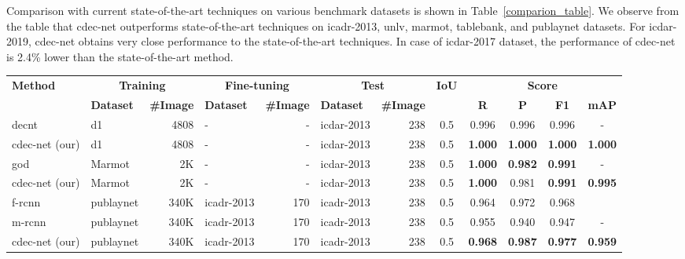 \documentclass[a4paper,conference]{IEEEtran}
\begin{document}
Comparison with current state-of-the-art techniques on various benchmark datasets is shown in Table~\ref{comparion_table}. We observe from the table that {\sc cd}e{\sc c-n}et outperforms state-of-the-art techniques on {\sc icadr-2013}, {\sc unlv}, {\sc m}armot, {\sc t}able{\sc b}ank, and {\sc p}ub{\sc l}ay{\sc n}et datasets. For {\sc icdar-2019}, {\sc cd}e{\sc c-n}et obtains very close performance to the state-of-the-art techniques. In case of {\sc icdar-2017} dataset, the performance of {\sc cd}e{\sc c-n}et is 2.4\% lower than the state-of-the-art method.

\begin{table*}
\addtolength{\tabcolsep}{-1.0pt}
\begin{center}
\begin{tabular}{|l| l | r|l |r|l|r| c| c c c c|} \hline
\textbf{Method} &\multicolumn{2}{|c|}{\textbf{Training}} &\multicolumn{2}{|c|}{\textbf{Fine-tuning}} &\multicolumn{2}{|c|}{\textbf{Test}} &\textbf{IoU} & \multicolumn{4}{|c|}{\textbf{Score}} \\ \cline{2-7} \cline{9-12}
  &\textbf{Dataset} &\textbf{\#Image} &\textbf{Dataset} &\textbf{\#Image} &\textbf{Dataset} &\textbf{\#Image} &  &\textbf{R} &\textbf{P} &\textbf{F1} &\textbf{mAP} \\ \hline
{\sc d}e{\sc cnt}~\cite{siddiqui2018decnt} &{\sc d}1 &4808 &- &- &{\sc icdar}-2013 &238 &0.5 &0.996 &0.996 &0.996 &- \\ 
{\sc cd}e{\sc c-n}et (our) &{\sc d}1 &4808 &- &- &{\sc icdar}-2013 &238 &0.5 &\textbf{1.000} &\textbf{1.000} &\textbf{1.000} &\textbf{1.000} \\ 
\hhline{|=|=|=|=|=|=|=|=|====|}
{\sc god}~\cite{saha2019graphical}   &Marmot &2K &- &- &{\sc icdar}-2013 &238 &0.5  &\textbf{1.000} &\textbf{0.982} &\textbf{0.991} &-  \\ 
{\sc cd}e{\sc c-n}et (our)         &Marmot &2K &-  &-  &{\sc icdar}-2013 &238 &0.5  &\textbf{1.000} &0.981 &\textbf{0.991} &\textbf{0.995}  \\ \hhline{|=|=|=|=|=|=|=|=|====|} 
{\sc f-rcnn}~\cite{zhong2019publaynet} &{\sc p}ub{\sc l}ay{\sc n}et &340K &{\sc icadr}-2013 &170 &{\sc icadr}-2013 &238 &0.5 &0.964 &0.972 &0.968 &  \\ 
{\sc m-rcnn}~\cite{zhong2019publaynet} &{\sc p}ub{\sc l}ay{\sc n}et &340K &{\sc icadr}-2013 &170 &{\sc icadr}-2013 &238 &0.5 &0.955 &0.940 &0.947 &-  \\ 
{\sc cd}e{\sc c-n}et (our) &{\sc p}ub{\sc l}ay{\sc n}et &340K &{\sc icadr}-2013 &170 &{\sc icadr}-2013 &238 &0.5 & \textbf{0.968}	& \textbf{0.987} & \textbf{0.977} & \textbf{0.959} \\ 

\end{tabular}
\end{center}
\end{table*}
\end{document}
